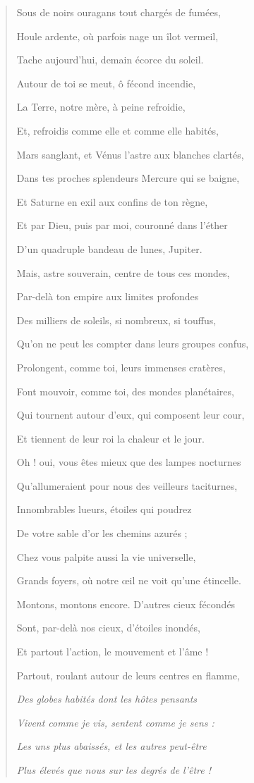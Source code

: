 \documentclass[a4paper, 11pt, oneside, landscape]{article}
\begin{document}
\begin{quotation}
Sous de noirs ouragans tout chargés de fumées,

Houle ardente, où parfois nage un îlot vermeil,

Tache aujourd'hui, demain écorce du soleil.

Autour de toi se meut, ô fécond incendie,

La Terre, notre mère, à peine refroidie,

Et, refroidis comme elle et comme elle habités,

Mars sanglant, et Vénus l'astre aux blanches clartés,

Dans tes proches splendeurs Mercure qui se baigne,

Et Saturne en exil aux confins de ton règne,

Et par Dieu, puis par moi, couronné dans l'éther

D'un quadruple bandeau de lunes, Jupiter.

\bigskip

Mais, astre souverain, centre de tous ces mondes,

Par-delà ton empire aux limites profondes

Des milliers de soleils, si nombreux, si touffus,

Qu'on ne peut les compter dans leurs groupes confus,

Prolongent, comme toi, leurs immenses cratères,

Font mouvoir, comme toi, des mondes planétaires,

Qui tournent autour d'eux, qui composent leur cour,

Et tiennent de leur roi la chaleur et le jour.

Oh ! oui, vous êtes mieux que des lampes nocturnes

Qu'allumeraient pour nous des veilleurs taciturnes,

Innombrables lueurs, étoiles qui poudrez

De votre sable d'or les chemins azurés ;

Chez vous palpite aussi la vie universelle,

Grands foyers, où notre œil ne voit qu'une étincelle.

Montons, montons encore. D'autres cieux fécondés

Sont, par-delà nos cieux, d'étoiles inondés,

Et partout l'action, le mouvement et l'âme !

Partout, roulant autour de leurs centres en flamme,

\emph{Des globes habités dont les hôtes pensants}

\emph{Vivent comme je vis, sentent comme je sens :}

\emph{Les uns plus abaissés, et les autres peut-être}

\emph{Plus élevés que nous sur les degrés de l'être !}
\end{quotation}
\end{document}
